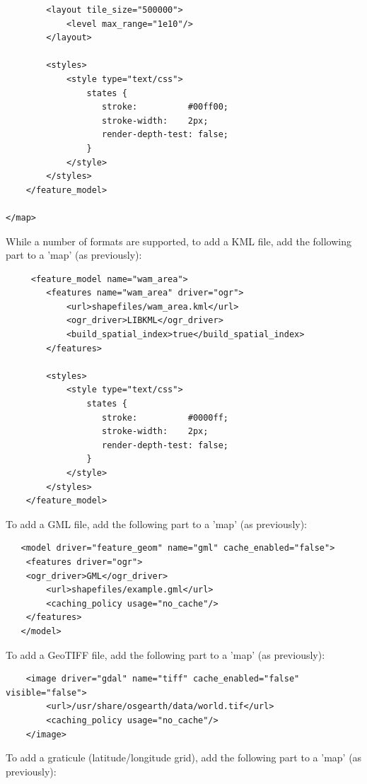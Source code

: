 {\begin{verbatim}
        <layout tile_size="500000">
            <level max_range="1e10"/>
        </layout>

        <styles>
            <style type="text/css">
                states {
                   stroke:          #00ff00; 
                   stroke-width:    2px;
                   render-depth-test: false;
                }                    
            </style>
        </styles>        
    </feature_model>
  
</map>
\end{verbatim}

While a number of formats are supported, to add a KML file, add the following part to a 'map' (as previously):

\begin{verbatim}
     <feature_model name="wam_area">
        <features name="wam_area" driver="ogr">
            <url>shapefiles/wam_area.kml</url>
            <ogr_driver>LIBKML</ogr_driver>
            <build_spatial_index>true</build_spatial_index>
        </features>        

        <styles>
            <style type="text/css">
                states {
                   stroke:          #0000ff; 
                   stroke-width:    2px;
                   render-depth-test: false;
                }                    
            </style>
        </styles>        
    </feature_model>
\end{verbatim}

To add a GML file, add the following part to a 'map' (as previously):

\begin{verbatim}
   <model driver="feature_geom" name="gml" cache_enabled="false">
    <features driver="ogr">
	<ogr_driver>GML</ogr_driver>
        <url>shapefiles/example.gml</url>
        <caching_policy usage="no_cache"/>
    </features>
   </model>
\end{verbatim}

To add a GeoTIFF file, add the following part to a 'map' (as previously):

\begin{verbatim}
    <image driver="gdal" name="tiff" cache_enabled="false" visible="false">
        <url>/usr/share/osgearth/data/world.tif</url>
        <caching_policy usage="no_cache"/>
    </image>
\end{verbatim}

To add a graticule (latitude/longitude grid), add the following part to a 'map' (as previously):

}

